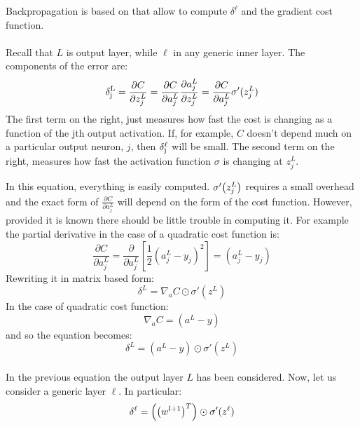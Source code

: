 Backpropagation is based on  that allow to compute $\delta^\ell$ and the gradient cost function.


\paragraph{} Recall that $L$ is output layer, while $\ell$ in any generic inner layer. The components of the error are:
\begin{equation}
\mathrm{\delta^L_j} =\frac{\partial C}{\partial z_j^L} = \frac{\partial C}{\partial a_j^L} \frac{\partial a_j^L}{\partial z_j^L} = \frac{\partial C}{\partial a_j^L} \sigma'(z_j^L)
\end{equation}
The first term on the right, just measures how fast the cost is changing as a function of the jth output activation. If, for example, $C$ doesn't depend much on a particular output neuron, $j$, then $\mathrm{\delta^\ell_j}$ will be small. The second term on the right, measures how fast the activation function $\sigma$ is changing at $z^L_j$.

In this equation, everything is easily computed. $\sigma'\br{z_j^L}$ requires a small overhead and the exact form of $\frac{\partial C}{\partial a_j^L}$ will depend on the form of the cost function. However, provided it is known there should be little trouble in computing it. For example the partial derivative in the case of a quadratic cost function is:
\begin{equation}
\frac{\partial C}{\partial a_j^L} = \frac{\partial }{\partial a_j^L} \left[\frac{1}{2}\left( a_j^L - y_j\right)^2 \right]=\left( a_j^L - y_j\right)
\label{eq:NN1}
\end{equation}
Rewriting it in matrix based form:
\begin{equation}
\delta^L = \nabla_a C \odot \sigma'(z^L)
\end{equation}
In the case of quadratic cost function:
\begin{equation}
 \nabla_a C = \left( a^L - y\right)
\end{equation}
and so the equation becomes:
\begin{equation}
\delta^L = \left( a^L - y\right) \odot \sigma'(z^L)
\end{equation}

\paragraph{} In the previous equation the output layer $L$ has been considered. Now, let us consider a generic layer $\ell$. In particular:
\begin{equation}
\mathrm{\delta^\ell} = \left(\left(w^{l+1}\right)^T\right)\odot \sigma'(z^\ell)
\end{equation}

